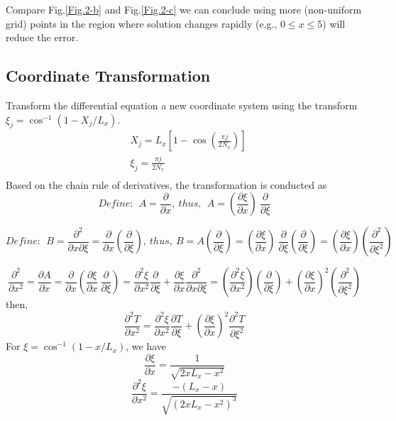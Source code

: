 \documentclass[12pt,a4paper]{article} %
\begin{document}
\begin{CJK}{UTF8}{song}
Compare Fig.\ref{Fig.2-b} and Fig.\ref{Fig.2-c} we can conclude using more (non-uniform grid) points in the region where solution changes rapidly (e.g., $0\leq x \leq 5$) will reduce the error.

\subsection{Coordinate Transformation}
Transform the differential equation a new coordinate system using the transform $\xi_{j}=\cos^{-1}(1-X_{j}/L_{x})$.
\begin{equation}
\begin{split}
&   X_{j}=L_{x}[1-\cos(\frac{\pi j}{2N_{x}})] \\
&   \xi_{j}=\frac{\pi j}{2N_{x}} \\
\end{split}
\end{equation}
Based on the chain rule of derivatives, the transformation is conducted as
\begin{equation}
Define: \ \  A = \frac{\partial }{\partial x},\ thus, \ \  A= (\frac{\partial \xi}{\partial x}) \ \frac{\partial }{\partial \xi}
\end{equation}

\begin{equation}
Define: \ \ B=\frac{\partial ^{2}}{\partial x \partial \xi}=\frac{\partial}{\partial x}(\frac{\partial }{\partial \xi})
,\ thus,\ B=A(\frac{\partial }{\partial \xi})= (\frac{\partial \xi}{\partial x}) \ \frac{\partial }{\partial \xi} (\frac{\partial }{\partial \xi})=(\frac{\partial \xi}{\partial x})(\frac{\partial ^{2}}{\partial \xi^{2}})
\end{equation}

\begin{equation}
\frac{\partial ^{2}}{\partial x^{2}} =\frac{\partial A}{\partial x}=\frac{\partial }{\partial x}(\frac{\partial \xi}{\partial x} \ \frac{\partial }{\partial \xi} ) = \frac{\partial^{2}\xi}{\partial x^{2}}\frac{\partial }{\partial \xi}+\frac{\partial \xi}{\partial x}\frac{\partial ^{2}}{\partial x \partial \xi}=(\frac{\partial ^{2}\xi}{\partial x^{2}})(\frac{\partial }{\partial \xi})+(\frac{\partial \xi}{\partial x})^{2}(\frac{\partial ^{2}}{\partial \xi^{2}}) \label{Eq.partial}
\end{equation}
then,
\begin{equation}
\frac{\partial ^{2}T}{\partial x^{2}}=
\frac{\partial ^{2}\xi}{\partial x^{2}}\frac{\partial T}{\partial \xi}+(\frac{\partial \xi}{\partial x})^{2}\frac{\partial ^{2}T}{\partial \xi^{2}}
\end{equation}
For $\xi=\cos^{-1}(1-x/L_{x})$, we have
\begin{equation}
\frac{\partial \xi}{\partial x}=\frac{1}{\sqrt{2x L_{x}-x^{2}}}
\end{equation}
\begin{equation}
\frac{\partial ^{2}\xi}{\partial x^{2}}=\frac{-(L_{x}-x)}{\sqrt{(2x L_{x}-x^{2})^{3}}}
\end{equation}


\end{CJK}
\end{document}
